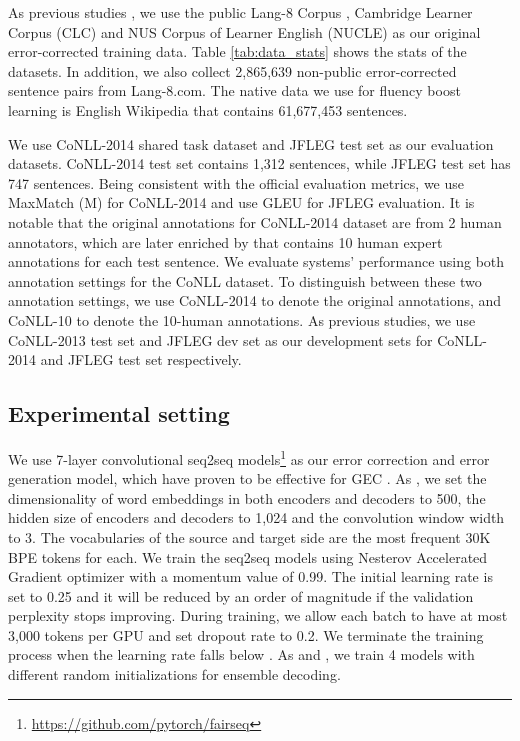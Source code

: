 \documentclass{article} \usepackage{MSRA_TR,times}
\begin{document}
As previous studies \citep{ji2017nested}, we use the public Lang-8 Corpus \citep{mizumoto2011mining,tajiri2012tense}, Cambridge Learner Corpus (CLC) \citep{nicholls2003cambridge} and NUS Corpus of Learner English (NUCLE) \citep{dahlmeier2013building} as our original error-corrected training data. Table \ref{tab:data_stats} shows the stats of the datasets. In addition, we also collect 2,865,639 non-public error-corrected sentence pairs from Lang-8.com. The native data we use for fluency boost learning is English Wikipedia that contains 61,677,453 sentences.

We use CoNLL-2014 shared task dataset \citep{ng2014conll} and JFLEG \citep{napoles2017jfleg} test set as our evaluation datasets. CoNLL-2014 test set contains 1,312 sentences, while JFLEG test set has 747 sentences. Being consistent with the official evaluation metrics, we use MaxMatch (M)  \citep{dahlmeier-ng:2012:NAACL-HLT} for CoNLL-2014 and use GLEU \citep{napoles2015ground} for JFLEG evaluation. It is notable that the original annotations for CoNLL-2014 dataset are from 2 human annotators, which are later enriched by \cite{bryant2015far} that contains 10 human expert annotations for each test sentence. We evaluate systems' performance using both annotation settings for the CoNLL dataset. To distinguish between these two annotation settings, we use CoNLL-2014 to denote the original annotations, and CoNLL-10 to denote the 10-human annotations.
As previous studies, we use CoNLL-2013 test set and JFLEG dev set as our development sets for CoNLL-2014 and JFLEG test set respectively.

\subsection{Experimental setting}\label{subsec:setting}

We use 7-layer convolutional seq2seq models\footnote{\url{https://github.com/pytorch/fairseq}} \citep{gehring2017convolutional} as our error correction and error generation model, which have proven to be effective for GEC \citep{chollampatt2018}. As \cite{chollampatt2018}, we set the dimensionality of word embeddings in both encoders and decoders to 500, the hidden size of encoders and decoders to 1,024 and the convolution window width to 3. The vocabularies of the source and target side are the most frequent 30K BPE tokens for each. We train the seq2seq models using Nesterov Accelerated Gradient \citep{sutskever2013importance} optimizer with a momentum
value of 0.99. The initial learning rate is set to 0.25 and it will be reduced by an order of magnitude if the validation perplexity stops
improving. During training, we allow each batch to have at most 3,000 tokens per GPU and set dropout rate to 0.2. We terminate the training process when the learning rate falls below . As \cite{chollampatt2018} and \cite{grundkiewicz2018near}, we train 4 models with different random initializations for ensemble decoding.
\end{document}
